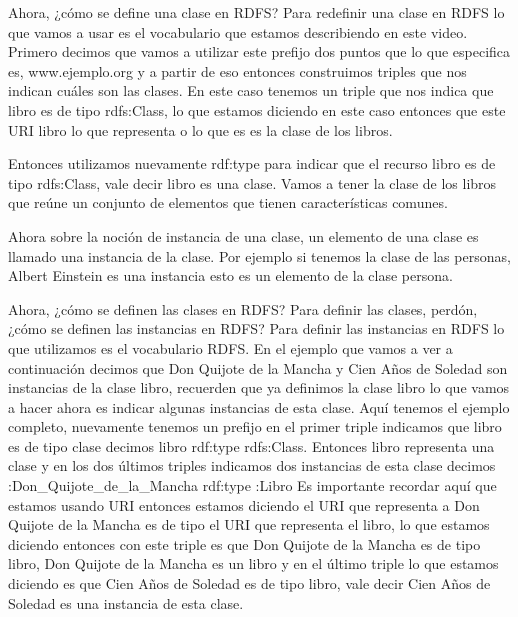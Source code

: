 Ahora, ¿cómo se define una clase en RDFS? Para redefinir una clase en RDFS lo que vamos a usar es el vocabulario que estamos describiendo en este video. Primero decimos que vamos a utilizar este prefijo dos puntos que lo que especifica es, www.ejemplo.org y a partir de eso entonces construimos triples que nos indican cuáles son las clases. En este caso tenemos un triple que nos indica que libro es de tipo rdfs:Class, lo que estamos diciendo en este caso entonces que este URI libro lo que representa o lo que es es la clase de los libros.

Entonces utilizamos nuevamente rdf:type para indicar que el recurso libro es de tipo rdfs:Class, vale decir libro es una clase. Vamos a tener la clase de los libros que reúne un conjunto de elementos que tienen características comunes.

Ahora sobre la noción de instancia de una clase, un elemento de una clase es llamado una instancia de la clase. Por ejemplo si tenemos la clase de las personas, Albert Einstein es una instancia esto es un elemento de la clase persona.

Ahora, ¿cómo se definen las clases en RDFS? Para definir las clases, perdón, ¿cómo se definen las instancias en RDFS? Para definir las instancias en RDFS lo que utilizamos es el vocabulario RDFS. En el ejemplo que vamos a ver a continuación decimos que Don Quijote de la Mancha y Cien Años de Soledad son instancias de la clase libro, recuerden que ya definimos la clase libro lo que vamos a hacer ahora es indicar algunas instancias de esta clase. Aquí tenemos el ejemplo completo, nuevamente tenemos un prefijo en el primer triple indicamos que libro es de tipo clase decimos libro rdf:type rdfs:Class. Entonces libro representa una clase y en los dos últimos triples indicamos dos instancias de esta clase decimos :Don_Quijote_de_la_Mancha rdf:type :Libro Es importante recordar aquí que estamos usando URI entonces estamos diciendo el URI que representa a Don Quijote de la Mancha es de tipo el URI que representa el libro, lo que estamos diciendo entonces con este triple es que Don Quijote de la Mancha es de tipo libro, Don Quijote de la Mancha es un libro y en el último triple lo que estamos diciendo es que Cien Años de Soledad es de tipo libro, vale decir Cien Años de Soledad es una instancia de esta clase.

